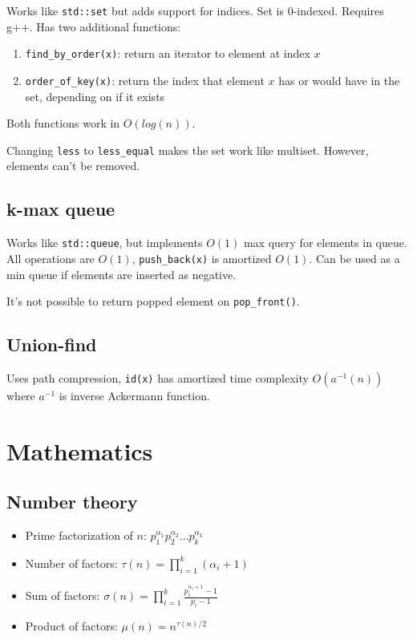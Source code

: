 \documentclass{article}
\begin{document}
Works like \texttt{std::set} but adds support for indices. Set is 0-indexed. Requires g++. Has two additional functions:

\begin{enumerate}
	\item \verb|find_by_order(x)|: return an iterator to element at index $x$
	\item \verb|order_of_key(x)|: return the index that element $x$ has or would have in the set, depending on if it exists
\end{enumerate}

Both functions work in $O(log(n))$.

Changing \texttt{less} to \verb|less_equal| makes the set work like multiset. However, elements can't be removed.



\subsection {k-max queue}

Works like \texttt{std::queue}, but implements $O(1)$ max query for elements in queue. All operations are $O(1)$, \texttt{push\_back(x)} is amortized $O(1)$. Can be used as a min queue if elements are inserted as negative.

It's not possible to return popped element on \texttt{pop\_front()}.



\subsection{Union-find}

Uses path compression, \texttt{id(x)} has amortized time complexity $O(a^{-1}(n))$ where $a^{-1}$ is inverse Ackermann function.



\section {Mathematics}

\subsection {Number theory}

\begin{itemize}
	\item Prime factorization of $n$: $p_1^{\alpha_1}p_2^{\alpha_2} \dots p_k^{\alpha_k}$
	\item Number of factors: $\tau(n) = \prod_{i=1}^{k} (\alpha_i+1)$
	\item Sum of factors: $\sigma(n) = \prod_{i=1}^{k} \frac{p_i^{\alpha_i+1}-1}{p_i-1}$
	\item Product of factors: $\mu(n) = n^{\tau(n)/2}$
\end{itemize}
\end{document}
